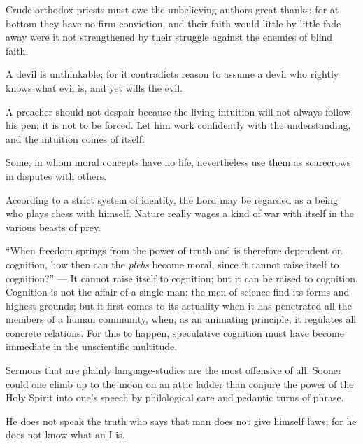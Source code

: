 \documentclass[12pt,a4paper]{article}
\newcommand{\opage}[1]{\marginnote{\footnotesize\textit{[#1]}}}
\newcommand{\aphsep}{\par\smallskip\centerline{\textasteriskcentered}\smallskip}
\begin{document}
\aphsep

Crude orthodox priests must owe the unbelieving authors great thanks; for at
bottom they have no firm conviction, and their faith would little by little fade
away were it not strengthened by their struggle against the enemies of blind
faith.

\aphsep

A devil is unthinkable; for it contradicts reason to assume a devil who rightly
knows what evil is, and yet wills the evil.

\aphsep

A preacher should not despair because the living intuition will not always follow
his pen; it is not to be forced. Let him work confidently with the understanding,
and the intuition comes of itself.

\aphsep

\opage{35}Some, in whom moral concepts have no life, nevertheless use them as
scarecrows in disputes with others.

\aphsep

According to a strict system of identity, the Lord may be regarded as a being who
plays chess with himself. Nature really wages a kind of war with itself in the
various beasts of prey.

\aphsep

``When freedom springs from the power of truth and is therefore dependent on
cognition, how then can the \textit{plebs} become moral, since it cannot raise
itself to cognition?'' --- It cannot raise itself to cognition; but it can be
raised to cognition. Cognition is not the affair of a single man; the men of
science find its forms and highest grounds; but it first comes to its actuality
when it has penetrated all the members of a human community, when, as an
animating principle, it regulates all concrete relations. For this to happen,
speculative cognition must have become immediate in the unscientific multitude.

\aphsep

Sermons that are plainly language-studies are the most offensive of all. Sooner
could one climb up to the moon on an attic ladder than conjure the power of the
Holy Spirit into one's speech by philological care and pedantic turns of phrase.

\aphsep

He does not speak the truth who says that man does not give himself laws; for he
does not know what an I is.

\aphsep
\end{document}
